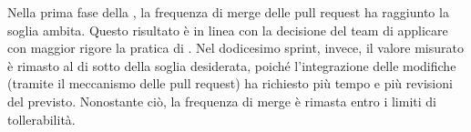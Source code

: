 \par Nella prima fase della , la frequenza di merge delle pull request ha raggiunto la soglia ambita. Questo risultato è in linea con la decisione del team di applicare con maggior rigore la pratica di . Nel dodicesimo sprint, invece, il valore misurato è rimasto al di sotto della soglia desiderata, poiché l'integrazione delle modifiche (tramite il meccanismo delle pull request) ha richiesto più tempo e più revisioni del previsto. Nonostante ciò, la frequenza di merge è rimasta entro i limiti di tollerabilità.
